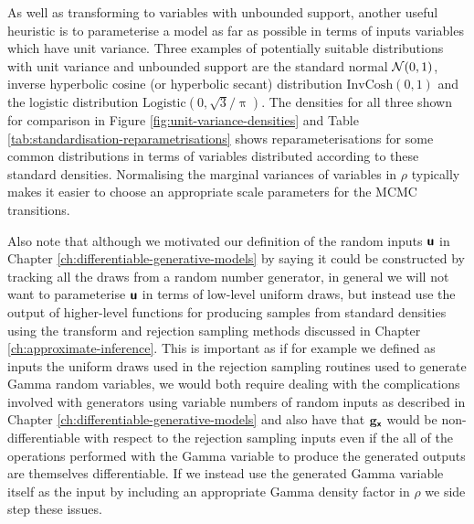 As well as transforming to variables with unbounded support, another useful heuristic is to parameterise a model as far as possible in terms of inputs variables which have unit variance. Three examples of potentially suitable distributions with unit variance and unbounded support are the standard normal $\nrm{0,1}$, inverse hyperbolic cosine (or hyperbolic secant) distribution $\textrm{InvCosh}(0,1)$ and the logistic distribution $\textrm{Logistic}(0,\sqrt{3}/\uppi)$. The densities for all three shown for comparison in Figure \ref{fig:unit-variance-densities} and Table \ref{tab:standardisation-reparametrisations} shows reparameterisations for some common distributions in terms of variables distributed according to these standard densities. Normalising the marginal variances of variables in $\rho$ typically makes it easier to choose an appropriate scale parameters for the \ac{MCMC} transitions. %

Also note that although we motivated our definition of the random inputs $\boldsymbol{\mathsf{u}}$ in Chapter \ref{ch:differentiable-generative-models} by saying it could be constructed by tracking all the draws from a random number generator, in general we will not want to parameterise $\boldsymbol{\mathsf{u}}$ in terms of low-level uniform draws, but instead use the output of higher-level functions for producing samples from standard densities using the transform and rejection sampling methods discussed in Chapter \ref{ch:approximate-inference}. This is important as if for example we defined as inputs the uniform draws used in the rejection sampling routines used to generate Gamma random variables, we would both require dealing with the complications involved with generators using variable numbers of random inputs as described in Chapter \ref{ch:differentiable-generative-models} and also have that ${\mathbf{g}}_{\boldsymbol{\mathsf{x}}}$ would be non-differentiable with respect to the rejection sampling inputs even if the all of the operations performed with the Gamma variable to produce the generated outputs are themselves differentiable. If we instead use the generated Gamma variable itself as the input by including an appropriate Gamma density factor in $\rho$ we side step these issues. 

